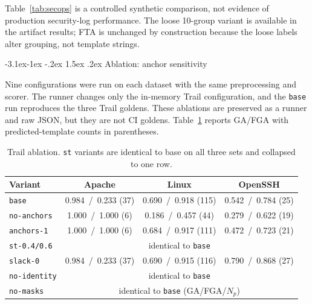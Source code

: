 \documentclass[11pt]{article}
\makeatletter
\renewcommand\subsection{\@startsection{subsection}{2}{\z@}%
  {-3.1ex\@plus -1ex \@minus -.2ex}%
  {1.5ex \@plus .2ex}%
  {\normalfont\large\bfseries}}
\makeatother
\begin{document}
Table~\ref{tab:secops} is a controlled synthetic comparison, not
evidence of production security-log performance. The loose 10-group
variant is available in the artifact results; FTA is unchanged by
construction because the loose labels alter grouping, not template
strings.

\subsection{Ablation: anchor sensitivity}

Nine configurations were run on each dataset with the same
preprocessing and scorer. The runner changes only the in-memory Trail
configuration, and the \texttt{base} run reproduces the three Trail
goldens. These ablations are preserved as a runner and raw JSON, but
they are not CI goldens. Table~\ref{tab:ablation} reports GA/FGA with
predicted-template counts in parentheses.

\begin{table}[H]
\centering
\small
\caption{Trail ablation. \texttt{st} variants are identical to base on all
three sets and collapsed to one row.}
\label{tab:ablation}
\begin{tabular}{lccc}
\toprule
Variant & Apache & Linux & OpenSSH \\
\midrule
\texttt{base} & 0.984~/~0.233 (37) & 0.690~/~0.918 (115) & 0.542~/~0.784 (25) \\
\texttt{no-anchors} & 1.000~/~1.000 (6) & 0.186~/~0.457 (44) & 0.279~/~0.622 (19) \\
\texttt{anchors-1} & 1.000~/~1.000 (6) & 0.684~/~0.917 (111) & 0.472~/~0.723 (21) \\
\texttt{st-0.4/0.6} & \multicolumn{3}{c}{identical to \texttt{base}} \\
\texttt{slack-0} & 0.984~/~0.233 (37) & 0.690~/~0.915 (116) & 0.790~/~0.868 (27) \\
\texttt{no-identity} & \multicolumn{3}{c}{identical to \texttt{base}} \\
\texttt{no-masks} & \multicolumn{3}{c}{identical to \texttt{base} (GA/FGA/$N_p$)} \\
\bottomrule
\end{tabular}
\end{table}
\end{document}
